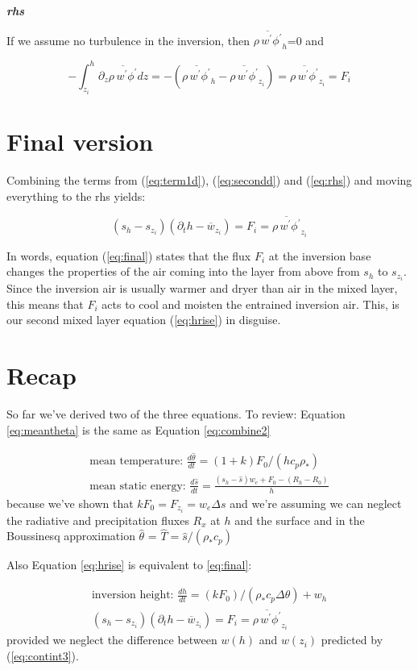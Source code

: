 \documentclass[12pt]{article}
\begin{document}
\noindent
\textit{\textbf{rhs}}

If we assume no turbulence in the inversion, then $\overline{\rho\, w^\prime \phi^\prime}_h$=0 and

\begin{equation}
  \label{eq:rhs}
   - \int_{z_i}^{h} \partial_z \overline{\rho\, w^\prime \phi^\prime} dz = - \left ( \overline{\rho\, w^\prime \phi^\prime}_h -
\overline{\rho\, w^\prime \phi^\prime}_{z_i} \right ) = \overline{\rho\, w^\prime \phi^\prime}_{z_i} = F_i
\end{equation}

\section{Final version}

Combining the terms from (\ref{eq:term1d}), (\ref{eq:secondd}) and (\ref{eq:rhs}) and moving everything to the rhs yields:

\begin{equation}
  \label{eq:final}
(s_h - s_{z_i}) (\partial_t h - \overline{w}_{z_i}) =  F_i =  \overline{\rho\, w^\prime \phi^\prime}_{z_i}
\end{equation}

In words, equation (\ref{eq:final}) states that the flux $F_i$ at the inversion base
changes the properties of the air coming into the layer from above from $s_h$ to $s_{z_i}$.  Since
the inversion air is usually warmer and dryer than air in the mixed layer, this means that $F_i$ acts
to cool and moisten the entrained inversion air.  This, is our second mixed layer equation (\ref{eq:hrise})
in disguise.

\section{Recap}
\label{sec:recap}

So far we've derived two of the three equations.  To review:
Equation \eqref{eq:meantheta} is the same as Equation
\eqref{eq:combine2}

\begin{gather*}
  \text{mean temperature: } \frac{d \hat{\theta} }{dt} =(1 + k) F_0/(h c_p\rho_*)\\
\text{mean static energy: } \frac{d \hat{s}}{dt} = \frac{ (s_h - \hat{s} )w_e + F_0 - ( R_h  - R_0 )}{h}
\end{gather*}
because we've shown that $k F_0 = F_{z_i}= w_e \Delta s$ and we're assuming
we can neglect the radiative and precipitation fluxes $R_x$ at $h$ and
the surface and in the Boussinesq approximation $\hat{\theta}$ =
$\hat{T} = \hat{s}/(\rho_* c_p)$

Also Equation \eqref{eq:hrise} is equivalent to \eqref{eq:final}:

\begin{gather*}
\text{inversion height: } \frac{dh }{dt} = ( k F_0)/(\rho_* c_p \Delta \theta) + w_h \label{eq:hriseb}\\
(s_h - s_{z_i}) (\partial_t h - \overline{w}_{z_i}) =  F_i =  \overline{\rho\, w^\prime \phi^\prime}_{z_i}
\end{gather*}
provided we neglect the difference between $w(h)$ and $w(z_i)$
predicted by (\ref{eq:contint3}).
\end{document}
